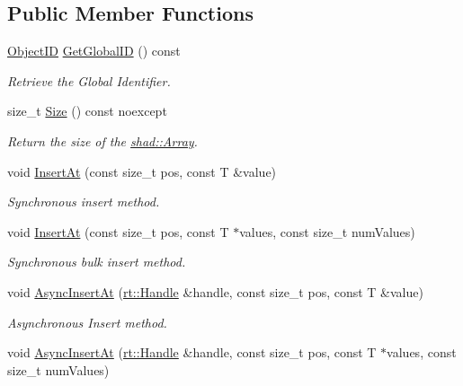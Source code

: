 \subsection*{Public Member Functions}
\begin{DoxyCompactItemize}
\item 
\hyperlink{classshad_1_1Array_a69c0b0424c09d4779081e358548a3165}{Object\-I\-D} \hyperlink{classshad_1_1Array_a6340a0b0ce2b34964e580a86f0c9cbcd}{Get\-Global\-I\-D} () const 
\begin{DoxyCompactList}\small\item\em Retrieve the Global Identifier. \end{DoxyCompactList}\item 
size\-\_\-t \hyperlink{classshad_1_1Array_ab6ebd2321e693fbcbf6ff6ec90a12f56}{Size} () const noexcept
\begin{DoxyCompactList}\small\item\em Return the size of the \hyperlink{classshad_1_1Array}{shad\-::\-Array}. \end{DoxyCompactList}\item 
void \hyperlink{classshad_1_1Array_ae90ba873251e3dd7afb36fc58a1aa648}{Insert\-At} (const size\-\_\-t pos, const T \&value)
\begin{DoxyCompactList}\small\item\em Synchronous insert method. \end{DoxyCompactList}\item 
void \hyperlink{classshad_1_1Array_a3f460d2e4d34fe22fa2ede421e668da0}{Insert\-At} (const size\-\_\-t pos, const T $\ast$values, const size\-\_\-t num\-Values)
\begin{DoxyCompactList}\small\item\em Synchronous bulk insert method. \end{DoxyCompactList}\item 
void \hyperlink{classshad_1_1Array_a0e145550478683482a1601031535c8cf}{Async\-Insert\-At} (\hyperlink{classshad_1_1rt_1_1Handle}{rt\-::\-Handle} \&handle, const size\-\_\-t pos, const T \&value)
\begin{DoxyCompactList}\small\item\em Asynchronous Insert method. \end{DoxyCompactList}\item 
void \hyperlink{classshad_1_1Array_af3e5d9c1664af29e635e1ed6c96eaf70}{Async\-Insert\-At} (\hyperlink{classshad_1_1rt_1_1Handle}{rt\-::\-Handle} \&handle, const size\-\_\-t pos, const T $\ast$values, const size\-\_\-t num\-Values)

\end{DoxyCompactItemize}
